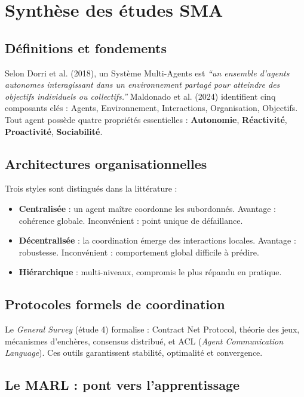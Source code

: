 \documentclass[12pt,a4paper]{report}
\begin{document}
\section{Synthèse des études SMA}

\subsection{Définitions et fondements}

Selon Dorri et al. (2018), un Système Multi-Agents est \textit{``un ensemble d'agents
autonomes interagissant dans un environnement partagé pour atteindre des objectifs
individuels ou collectifs.''}
Maldonado et al. (2024) identifient cinq composants clés : Agents, Environnement,
Interactions, Organisation, Objectifs. Tout agent possède quatre propriétés
essentielles : \textbf{Autonomie}, \textbf{Réactivité}, \textbf{Proactivité},
\textbf{Sociabilité}.

\subsection{Architectures organisationnelles}

Trois styles sont distingués dans la littérature :

\begin{itemize}
  \item \textbf{Centralisée} : un agent maître coordonne les subordonnés. Avantage :
        cohérence globale. Inconvénient : point unique de défaillance.
  \item \textbf{Décentralisée} : la coordination émerge des interactions locales.
        Avantage : robustesse. Inconvénient : comportement global difficile à prédire.
  \item \textbf{Hiérarchique} : multi-niveaux, compromis le plus répandu en pratique.
\end{itemize}

\subsection{Protocoles formels de coordination}

Le \textit{General Survey} (étude 4) formalise : Contract Net Protocol, théorie des
jeux, mécanismes d'enchères, consensus distribué, et ACL (\textit{Agent Communication
Language}). Ces outils garantissent stabilité, optimalité et convergence.

\subsection{Le MARL : pont vers l'apprentissage}
\end{document}
